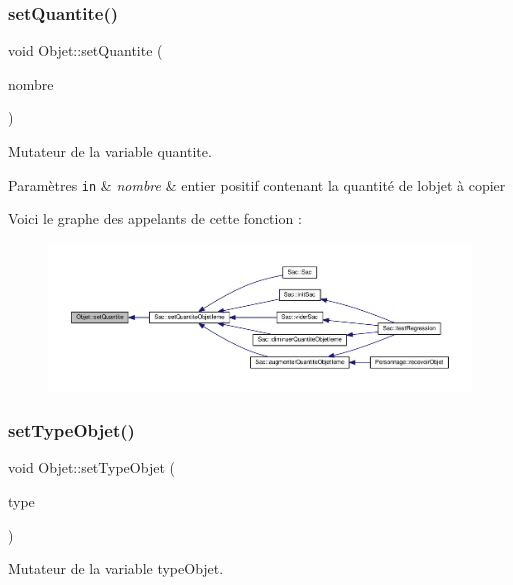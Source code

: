 \subsubsection{\texorpdfstring{set\+Quantite()}{setQuantite()}}
{\footnotesize\ttfamily void Objet\+::set\+Quantite (\begin{DoxyParamCaption}\item[{unsigned int}]{nombre }\end{DoxyParamCaption})}



Mutateur de la variable quantite. 


\begin{DoxyParams}[1]{Paramètres}
\mbox{\tt in}  & {\em nombre} & entier positif contenant la quantité de l\textquotesingle{}objet à copier \\
\hline
\end{DoxyParams}
Voici le graphe des appelants de cette fonction \+:\nopagebreak
\begin{figure}[H]
\begin{center}
\leavevmode
\includegraphics[width=350pt]{class_objet_a92eac9151b39f0a03a94ba02f25018c9_icgraph}
\end{center}
\end{figure}
\mbox{\label{class_objet_a2183a02ee228f3ba1e52e0e5b9904dce}} 
\subsubsection{\texorpdfstring{set\+Type\+Objet()}{setTypeObjet()}}
{\footnotesize\ttfamily void Objet\+::set\+Type\+Objet (\begin{DoxyParamCaption}\item[{const Type\+Objet \&}]{type }\end{DoxyParamCaption})}



Mutateur de la variable type\+Objet. 


